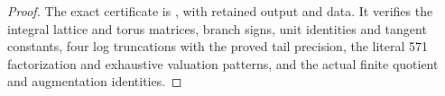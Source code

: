 \begin{proof}
The exact certificate is
, with retained
output and data.  It verifies the integral lattice and torus
matrices, branch signs, unit identities and tangent constants,
four log truncations with the proved tail precision, the literal
571 factorization and exhaustive valuation patterns, and the
actual finite quotient and augmentation identities.
\end{proof}
